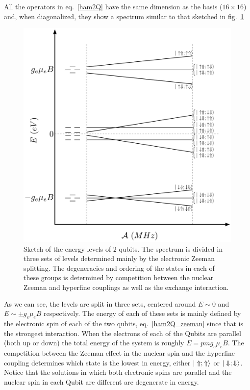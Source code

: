 All the operators in eq.~\eqref{ham2Q} have the same dimension as the basis ($16\times16$) and, when diagonalized, they show a spectrum similar to that sketched in fig.~\ref{levels2Qbits}
\begin{figure}[h!]
\centering
  \includegraphics{chapter03/figures/levels2Qbits.pdf}
\vspace{-5pt}
\caption{Sketch of the energy levels of 2 qubits. The spectrum is divided in three sets of levels determined mainly by the electronic Zeeman splitting. The degeneracies and ordering of the states in each of these groups is determined by competition between the nuclear Zeeman and hyperfine couplings as well as the exchange interaction.}
\label{levels2Qbits}
\end{figure}
\FloatBarrier
As we  can see, the levels are split in three sets, centered around $E\sim0$ and $E\sim\pm g_e\mu_e B$ respectively. The energy of each of these sets is mainly defined by the electronic spin of each of the two qubits, eq.~\eqref{ham2Q_zeeman} since that is the strongest interaction.
When the electrons of each of the Qubits are parallel (both up or down) the total energy of the system is roughly $E=pm g_e\mu_e B$.
The competition between the Zeeman effect in the nuclear spin and the hyperfine coupling determines which state is the lowest in energy, either $|\Uparrow;\Uparrow\rangle$ or $|\Downarrow;\Downarrow\rangle$. Notice that the solutions in which both electronic spins are parallel and the nuclear spin in each Qubit are different are degenerate in energy.
